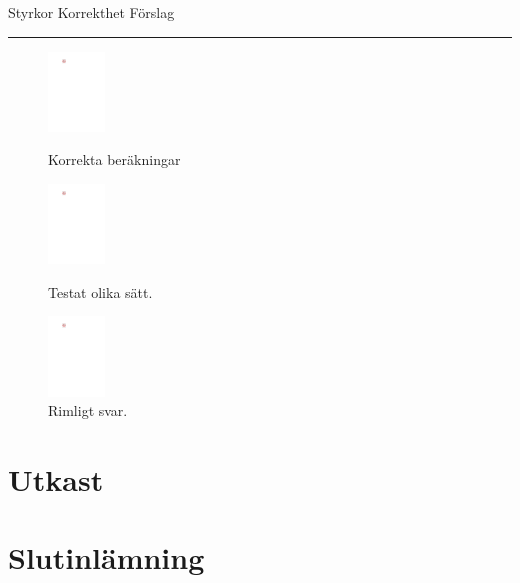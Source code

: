 \begin{questions}
\noindent Styrkor \hfill Korrekthet \hfill Förslag \hrule
\begin{figure}[H]
  \centering
  \includegraphics[width=1.5cm, page=8]{img/Bilder.pdf}
  \caption*{Korrekta beräkningar}
  \includegraphics[width=1.5cm, page=9]{img/Bilder.pdf}
  \caption*{Testat olika sätt.}
  \includegraphics[width=1.5cm, page=10]{img/Bilder.pdf}
  \caption*{Rimligt svar.}

\end{figure}
\newpage
\section*{Utkast}
\newpage
{}
\newpage
\section*{Slutinlämning}
\newpage
{}


\end{questions}

